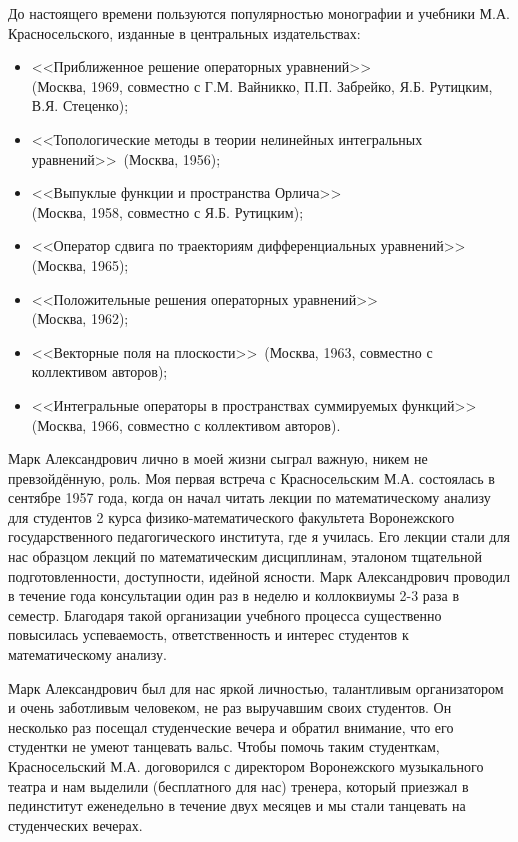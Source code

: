 До настоящего времени пользуются популярностью монографии и учебники М.А. Красносельского, изданные в центральных издательствах:
\begin{itemize}
\item <<Приближенное решение операторных уравнений>>\\(Москва, 1969, совместно с Г.М. Вайникко, П.П. Забрейко, Я.Б. Рутицким,
В.Я. Стеценко);
\item <<Топологические методы в теории нелинейных интегральных уравнений>>\, (Москва, 1956);
\item <<Выпуклые функции и пространства Орлича>>\,\\(Москва, 1958, совместно с Я.Б. Рутицким);
\item <<Оператор сдвига по траекториям дифференциальных уравнений>>\, (Москва, 1965);
\item <<Положительные решения операторных уравнений>>\\(Москва, 1962);
\item <<Векторные поля на плоскости>>\, (Москва, 1963, совместно с коллективом авторов);
\item <<Интегральные операторы в пространствах суммируемых функций>>\, (Москва, 1966, совместно с коллективом авторов).
\end{itemize}

Марк Александрович лично в моей жизни сыграл важную, никем не превзойдённую, роль. Моя первая встреча с Красносельским М.А.
состоялась в сентябре 1957 года, когда он начал читать лекции по математическому анализу для студентов 2 курса
физико-математического факультета Воронежского государственного педагогического института, где я училась. Его лекции стали для нас
образцом лекций по математическим дисциплинам, эталоном тщательной подготовленности, доступности, идейной ясности. Марк
Александрович проводил в течение года консультации один раз в неделю и коллоквиумы 2-3 раза в семестр. Благодаря такой
организации учебного процесса существенно повысилась успеваемость, ответственность и интерес студентов к
математическому анализу.

Марк Александрович был для нас яркой личностью, талантливым организатором и очень заботливым человеком, не раз выручавшим
своих студентов. Он несколько раз посещал студенческие вечера и обратил внимание, что его студентки не умеют танцевать
вальс. Чтобы помочь таким студенткам, Красносельский М.А. договорился с директором Воронежского музыкального театра и нам выделили
(бесплатного для нас) тренера, который приезжал в пединститут еженедельно в течение двух месяцев и мы стали танцевать на
студенческих вечерах.

